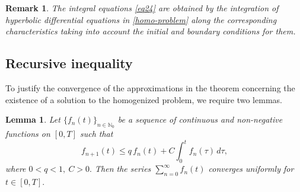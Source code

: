 \documentclass[reqno]{amsart}            %
\newtheorem{lemma}{Lemma}[section]
\newtheorem{remark}{Remark}[section]
\numberwithin{equation}{section}
\begin{document}
	\begin{remark}
		The integral equations \eqref{eq24} are obtained by the integration of hyperbolic differential equations in \eqref{homo-problem} along the corresponding characteristics taking into account the initial and boundary conditions for them. 
	\end{remark}
	
	\subsection{Recursive inequality}
	To justify the convergence of the approximations in the theorem concerning the existence of a solution to the homogenized problem, we require two lemmas.
	\begin{lemma}\label{lemma-4-2}
		Let $\{f_n(t)\}_{n\in \mathbb{N}_0}$ be a sequence of continuous and non-negative functions on $[0,T]$
		such that
		$$
		f_{n+1}(t) \le q\,f_n(t) + C \int_{0}^{t} f_n(\tau)\, d\tau,
		$$
		where $ 0 < q < 1,\ C > 0.$ Then the series $\sum_{n=0}^{\infty} f_n(t) $
		converges uniformly for $t\in[0,T].$ 
	\end{lemma}
\end{document}
